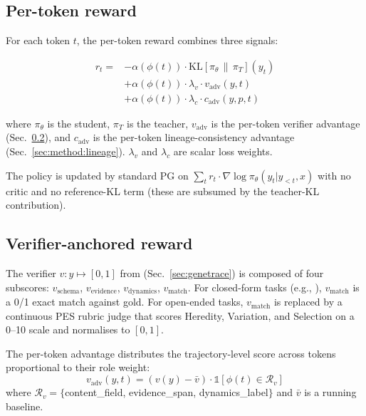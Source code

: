 \subsection{Per-token reward}
\label{sec:method:reward}

For each token $t$, the per-token reward combines three signals:

\begin{align}
  r_t = &- \alpha(\phi(t)) \cdot \mathrm{KL}[\pi_\theta \,\|\, \pi_T](y_t) \nonumber \\
        &+ \alpha(\phi(t)) \cdot \lambda_v \cdot v_{\mathrm{adv}}(y, t) \nonumber \\
        &+ \alpha(\phi(t)) \cdot \lambda_c \cdot c_{\mathrm{adv}}(y, p, t)
  \label{eq:rt}
\end{align}

where $\pi_\theta$ is the student, $\pi_T$ is the teacher,
$v_{\mathrm{adv}}$ is the per-token verifier advantage
(Sec.~\ref{sec:method:verifier}), and $c_{\mathrm{adv}}$ is the
per-token lineage-consistency advantage (Sec.~\ref{sec:method:lineage}).
$\lambda_v$ and $\lambda_c$ are scalar loss weights.

The policy is updated by standard PG on
$\sum_t r_t \cdot \nabla \log \pi_\theta(y_t | y_{<t}, x)$ with no critic
and no reference-KL term (these are subsumed by the teacher-KL
contribution).

\subsection{Verifier-anchored reward}
\label{sec:method:verifier}

The verifier $v: y \mapsto [0, 1]$ from \genetrace{}
(Sec.~\ref{sec:genetrace}) is composed of four subscores:
$v_{\mathrm{schema}}$, $v_{\mathrm{evidence}}$, $v_{\mathrm{dynamics}}$,
$v_{\mathrm{match}}$. For closed-form tasks (e.g., \geneexam{}),
$v_{\mathrm{match}}$ is a 0/1 exact match against gold. For open-ended
tasks, $v_{\mathrm{match}}$ is replaced by a continuous PES rubric judge
\citep{ideaevolving2025} that scores Heredity, Variation, and Selection
on a 0--10 scale and normalises to $[0, 1]$.

The per-token advantage distributes the trajectory-level score across
tokens proportional to their role weight:
\begin{equation}
  v_{\mathrm{adv}}(y, t) = (v(y) - \bar{v}) \cdot \mathbb{1}[\phi(t) \in \mathcal{R}_v]
  \label{eq:vadv}
\end{equation}
where $\mathcal{R}_v = \{$content\_field, evidence\_span, dynamics\_label$\}$
and $\bar{v}$ is a running baseline.

